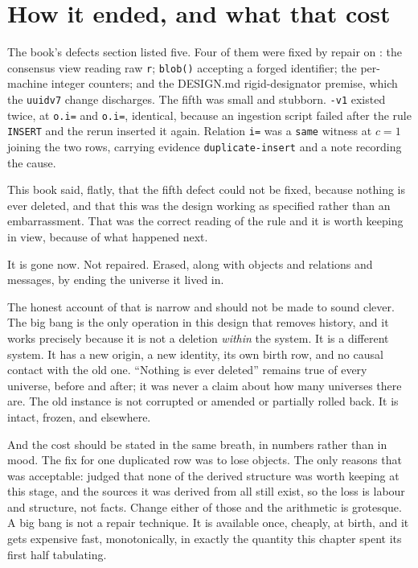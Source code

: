 \section{How it ended, and what that cost}
\label{sec:bigbang}

The book's defects section listed five. Four of them were fixed by repair on \labLineageWipeDate{}: the consensus view reading raw \texttt{r}; \texttt{blob()} accepting a forged identifier; the per-machine integer counters; and the DESIGN.md rigid-designator premise, which the \texttt{uuidv7} change discharges. The fifth was small and stubborn. \texttt{\labLineageTissueRuleName{}-v1} existed twice, at \texttt{o.i=\labLineageDupObjA{}} and \texttt{o.i=\labLineageDupObjB{}}, identical, because an ingestion script failed after the rule \texttt{INSERT} and the rerun inserted it again. Relation \texttt{i=\labLineageDupRel{}} was a \texttt{same} witness at $c=1$ joining the two rows, carrying evidence \texttt{duplicate-insert} and a note recording the cause.

This book said, flatly, that the fifth defect could not be fixed, because nothing is ever deleted, and that this was the design working as specified rather than an embarrassment. That was the correct reading of the rule and it is worth keeping in view, because of what happened next.

It is gone now. Not repaired. Erased, along with \labLineageObjects{} objects and \labLineageRelations{} relations and \labLineageMessages{} messages, by ending the universe it lived in.

The honest account of that is narrow and should not be made to sound clever. The big bang is the only operation in this design that removes history, and it works precisely because it is not a deletion \emph{within} the system. It is a different system. It has a new origin, a new identity, its own birth row, and no causal contact with the old one. ``Nothing is ever deleted'' remains true of every universe, before and after; it was never a claim about how many universes there are. The old instance is not corrupted or amended or partially rolled back. It is intact, frozen, and elsewhere.

And the cost should be stated in the same breath, in numbers rather than in mood. The fix for one duplicated row was to lose \labLineageObjects{} objects. The only reasons that was acceptable: \labOwner{} judged that none of the derived structure was worth keeping at this stage, and the sources it was derived from all still exist, so the loss is labour and structure, not facts. Change either of those and the arithmetic is grotesque. A big bang is not a repair technique. It is available once, cheaply, at birth, and it gets expensive fast, monotonically, in exactly the quantity this chapter spent its first half tabulating.

